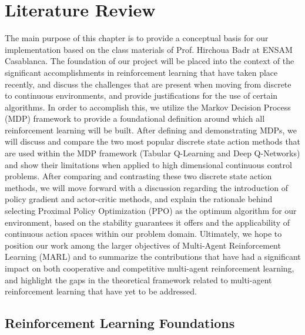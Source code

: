 \chapter{Literature Review}
\label{ch:lit_rev}

The main purpose of this chapter is to provide a conceptual basis for our implementation based on the class materials of Prof. Hirchoua Badr at ENSAM Casablanca. The foundation of our project will be placed into the context of the significant accomplishments in reinforcement learning that have taken place recently, and discuss the challenges that are present when moving from discrete to continuous environments, and provide justifications for the use of certain algorithms. In order to accomplish this, we utilize the Markov Decision Process (MDP) framework to provide a foundational definition around which all reinforcement learning will be built. After defining and demonstrating MDPs, we will discuss and compare the two most popular discrete state action methods that are used within the MDP framework (Tabular Q-Learning and Deep Q-Networks) and show their limitations when applied to high dimensional continuous control problems. After comparing and contrasting these two discrete state action methods, we will move forward with a discussion regarding the introduction of policy gradient and actor-critic methods, and explain the rationale behind selecting Proximal Policy Optimization (PPO) as the optimum algorithm for our environment, based on the stability guarantees it offers and the applicability of continuous action spaces within our problem domain. Ultimately, we hope to position our work among the larger objectives of Multi-Agent Reinforcement Learning (MARL) and to summarize the contributions that have had a significant impact on both cooperative and competitive multi-agent reinforcement learning, and highlight the gaps in the theoretical framework related to multi-agent reinforcement learning that have yet to be addressed.

\section{Reinforcement Learning Foundations}
\label{sec:lit_rl_foundations}

